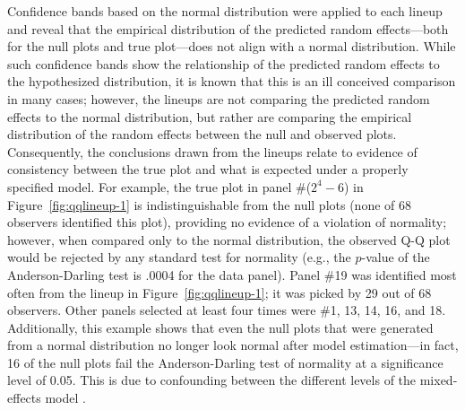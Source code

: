 \documentclass[12pt]{article} %
\newcommand{\hh}[1]{{\color{orange} #1}}
\newcommand{\al}[1]{{\color{ForestGreen} #1}}
\begin{document}
Confidence bands based on the normal distribution were applied to each lineup and reveal that the empirical distribution of the predicted random effects---both for the null plots and true plot---does not align with a normal distribution. While such confidence bands show the relationship of the predicted random effects to the hypothesized distribution, it is known that this is an ill conceived comparison in many cases; however, the lineups are not comparing the predicted random effects to the normal distribution, but rather are comparing the empirical distribution of the random effects between the null and observed plots. Consequently, the conclusions drawn from the lineups relate to evidence of consistency between the true plot and what is expected under a properly specified model. For example, the true plot in panel \#($2^4 - 6$) in Figure~\ref{fig:qqlineup-1}  is indistinguishable from the null plots (none of 68 observers identified this plot), providing no evidence of a violation of normality; however, when compared only to the normal distribution, the observed Q-Q plot would %
be rejected by any standard test for normality (e.g., the $p$-value of the Anderson-Darling test is .0004 for the data panel).
Panel \#19 was identified  most often from the lineup in Figure~\ref{fig:qqlineup-1}; it was picked by 29 out of 68 observers. Other panels  selected at least four times were \#1, 13, 14, 16, and 18. 
Additionally, this example shows that even the null plots that were generated from a normal distribution no longer look normal after  model estimation---in fact, 16 of the null plots fail the Anderson-Darling test of normality at a significance level of 0.05. This is due to confounding between the different levels of the mixed-effects model  \citep{adam}.
\end{document}
